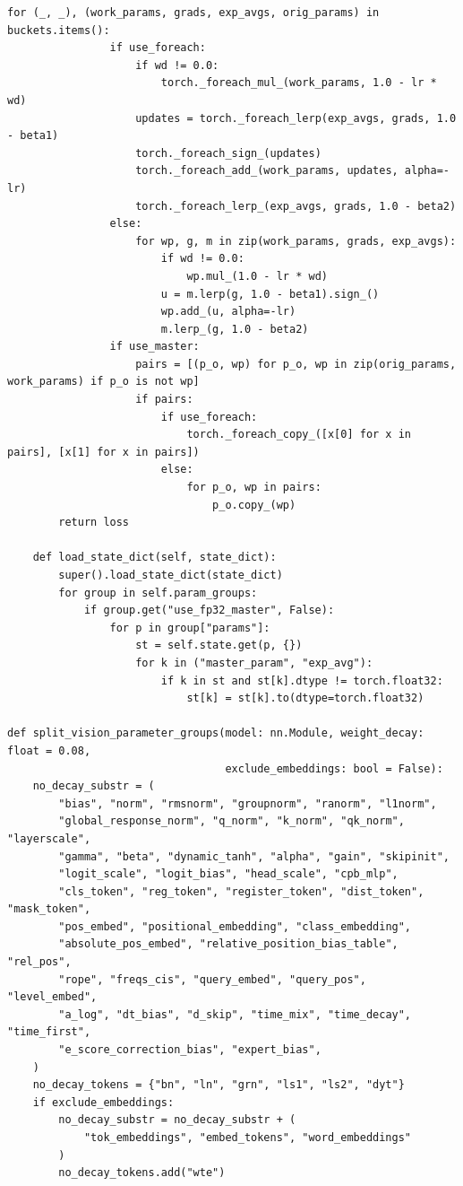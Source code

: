 \documentclass[11pt,a4paper]{article}
\renewcommand{\_}{\origunderscore\allowbreak}
\begin{document}
\begin{lstlisting}[caption={Standard LSO-Eval V-Eval: Vectorized PyTorch SimpleLion Optimizer (Chen et al., NeurIPS 2023, Algorithm 2) \& Decoupled Parameter Grouping}, label={lst:simplelion}]
            for (_, _), (work_params, grads, exp_avgs, orig_params) in buckets.items():
                if use_foreach:
                    if wd != 0.0:
                        torch._foreach_mul_(work_params, 1.0 - lr * wd)
                    updates = torch._foreach_lerp(exp_avgs, grads, 1.0 - beta1)
                    torch._foreach_sign_(updates)
                    torch._foreach_add_(work_params, updates, alpha=-lr)
                    torch._foreach_lerp_(exp_avgs, grads, 1.0 - beta2)
                else:
                    for wp, g, m in zip(work_params, grads, exp_avgs):
                        if wd != 0.0:
                            wp.mul_(1.0 - lr * wd)
                        u = m.lerp(g, 1.0 - beta1).sign_()
                        wp.add_(u, alpha=-lr)
                        m.lerp_(g, 1.0 - beta2)
                if use_master:
                    pairs = [(p_o, wp) for p_o, wp in zip(orig_params, work_params) if p_o is not wp]
                    if pairs:
                        if use_foreach:
                            torch._foreach_copy_([x[0] for x in pairs], [x[1] for x in pairs])
                        else:
                            for p_o, wp in pairs:
                                p_o.copy_(wp)
        return loss

    def load_state_dict(self, state_dict):
        super().load_state_dict(state_dict)
        for group in self.param_groups:
            if group.get("use_fp32_master", False):
                for p in group["params"]:
                    st = self.state.get(p, {})
                    for k in ("master_param", "exp_avg"):
                        if k in st and st[k].dtype != torch.float32:
                            st[k] = st[k].to(dtype=torch.float32)

def split_vision_parameter_groups(model: nn.Module, weight_decay: float = 0.08,
                                  exclude_embeddings: bool = False):
    no_decay_substr = (
        "bias", "norm", "rmsnorm", "groupnorm", "ranorm", "l1norm",
        "global_response_norm", "q_norm", "k_norm", "qk_norm", "layerscale",
        "gamma", "beta", "dynamic_tanh", "alpha", "gain", "skipinit",
        "logit_scale", "logit_bias", "head_scale", "cpb_mlp",
        "cls_token", "reg_token", "register_token", "dist_token", "mask_token",
        "pos_embed", "positional_embedding", "class_embedding",
        "absolute_pos_embed", "relative_position_bias_table", "rel_pos",
        "rope", "freqs_cis", "query_embed", "query_pos", "level_embed",
        "a_log", "dt_bias", "d_skip", "time_mix", "time_decay", "time_first",
        "e_score_correction_bias", "expert_bias",
    )
    no_decay_tokens = {"bn", "ln", "grn", "ls1", "ls2", "dyt"}
    if exclude_embeddings:
        no_decay_substr = no_decay_substr + (
            "tok_embeddings", "embed_tokens", "word_embeddings"
        )
        no_decay_tokens.add("wte")


\end{lstlisting}
\end{document}
